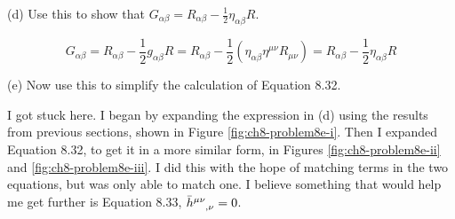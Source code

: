\documentclass[gr-notes.tex]{subfiles}
\begin{document}
(d) Use this to show that $G_{\alpha\beta} = R_{\alpha\beta} - \frac{1}{2} \eta_{\alpha\beta} R$.

\begin{displaymath}
  G_{\alpha\beta} =
  R_{\alpha\beta} - \frac{1}{2} g_{\alpha\beta} R =
  R_{\alpha\beta} - \frac{1}{2} (\eta_{\alpha\beta} \eta^{\mu\nu} R_{\mu\nu}) =
  R_{\alpha\beta} - \frac{1}{2} \eta_{\alpha\beta} R
\end{displaymath}

(e) Now use this to simplify the calculation of Equation 8.32.

I got stuck here. I began by expanding the expression in (d) using the results from previous sections, shown in Figure \ref{fig:ch8-problem8e-i}. Then I expanded Equation 8.32, to get it in a more similar form, in Figures \ref{fig:ch8-problem8e-ii} and \ref{fig:ch8-problem8e-iii}. I did this with the hope of matching terms in the two equations, but was only able to match one. I believe something that would help me get further is Equation 8.33, $\tensor{\bar{h}}{^{\mu\nu}_{,\nu}} = 0$.
\end{document}
